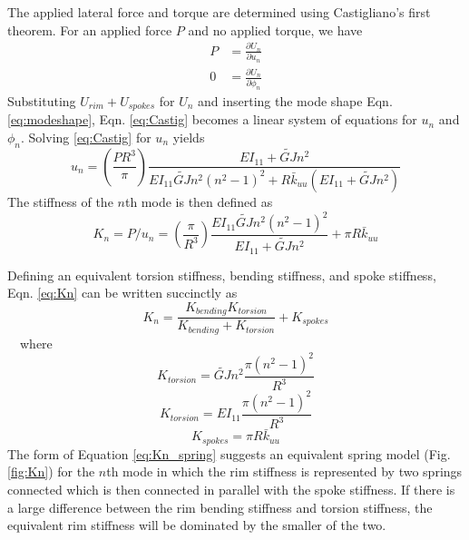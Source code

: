 \documentclass{bmd2016p}
\begin{document}
The applied lateral force and torque are determined using Castigliano's first theorem. For an applied force $P$ and no applied torque, we have
	\begin{equation}\label{eq:Castig}
	\begin{split}
	P &= \frac{\partial U_n}{\partial u_n}\\%
	0 &= \frac{\partial U_n}{\partial \phi_n}%
	\end{split}
	\end{equation}
Substituting $U_{rim} + U_{spokes}$ for $U_n$ and inserting the mode shape Eqn. \ref{eq:modeshape}, Eqn. \ref{eq:Castig} becomes a linear system of equations for $u_n$ and $\phi_n$. Solving \ref{eq:Castig} for $u_n$ yields
	\begin{equation}
	u_n = \left(\frac{PR^3}{\pi}\right) \frac{EI_{11}+\widetilde{GJ}n^2}{EI_{11}\widetilde{GJ}n^2(n^2-1)^2 + R\bar{k}_{uu}(EI_{11}+\widetilde{GJ}n^2)}
	\end{equation}
The stiffness of the $n$th mode is then defined as
	\begin{equation}\label{eq:Kn}
	K_n = P/u_n = \left(\frac{\pi}{R^3}\right) \frac{EI_{11}\widetilde{GJ}n^2(n^2-1)^2}{EI_{11}+\widetilde{GJ}n^2} + \pi R \bar{k}_{uu}
	\end{equation}

Defining an equivalent torsion stiffness, bending stiffness, and spoke stiffness, Eqn. \ref{eq:Kn} can be written succinctly as
	\begin{equation}\label{eq:Kn_spring}
	K_n = \frac{K_{bending}K_{torsion}}{K_{bending}+K_{torsion}} + K_{spokes}
	\end{equation}
\,\,\,\, where
	\begin{equation}\label{eq:Ktorsion}
	K_{torsion} = \widetilde{GJ}n^2\frac{\pi (n^2-1)^2}{R^3}
	\end{equation}
	\begin{equation}\label{eq:Kbending}
	K_{torsion} = EI_{11}\frac{\pi (n^2-1)^2}{R^3}
	\end{equation}
	\begin{equation}\label{eq:Kspokes}
	K_{spokes} = \pi R \bar{k}_{uu}
	\end{equation}
The form of Equation \ref{eq:Kn_spring} suggests an equivalent spring model (Fig. \ref{fig:Kn}) for the $n$th mode in which the rim stiffness is represented by two springs connected which is then connected in parallel with the spoke stiffness. If there is a large difference between the rim bending stiffness and torsion stiffness, the equivalent rim stiffness will be dominated by the smaller of the two.
\end{document}
